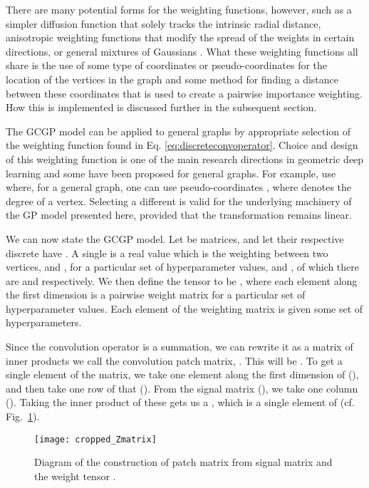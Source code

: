 \documentclass{article}
\begin{document}
There are many potential forms for the weighting functions, however, such as a simpler diffusion function that solely tracks the intrinsic radial distance, anisotropic weighting functions that modify the spread of the weights in certain directions, or general mixtures of Gaussians \citep{moNet}. What these weighting functions all share is the use of some type of coordinates or pseudo-coordinates for the location of the vertices in the graph and some method for finding a distance between these coordinates that is used to create a pairwise importance weighting. How this is implemented is discussed further in the subsequent section.

The GCGP model can be applied to general graphs by appropriate selection of the weighting function  found in Eq. \eqref{eq:discreteconvoperator}. Choice and design of this weighting function is one of the main research directions in geometric deep learning and some have been proposed for general graphs. For example, \citet{moNet} use  where, for a general graph, one can use pseudo-coordinates , where  denotes the degree of a vertex. Selecting a different  is valid for the underlying machinery of the GP model presented here, provided that the transformation remains linear.

We can now state the GCGP model. Let  be  matrices, and let their respective discrete  have . A single  is a real value which is the weighting between two vertices,  and , for a particular set of hyperparameter values,  and , of which there are  and  respectively. We then define the tensor  to be , where each element along the first dimension is a  pairwise weight matrix for a particular set of hyperparameter values. Each element of the weighting matrix is  given some set of hyperparameters.

Since the convolution operator is a summation, we can rewrite it as a matrix of inner products we call the convolution patch matrix, . This will be . To get a single element of the  matrix, we take one element along the first dimension of  (), and then take one row of that (). From the signal matrix  (), we take one column (). Taking the inner product of these gets us a , which is a single element of  (cf. Fig.~\ref{fig:Zmatrix}).



\begin{figure}[t]
\centering
\texttt{[image: cropped\_Zmatrix]}
\caption{Diagram of the construction of patch matrix  from signal matrix  and the weight tensor .}\label{fig:Zmatrix}
\end{figure}
\end{document}
